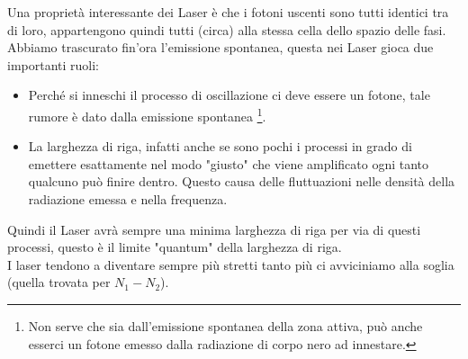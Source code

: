 Una proprietà interessante dei Laser è che i fotoni uscenti sono tutti identici tra di loro, appartengono quindi tutti (circa) alla stessa cella dello spazio delle fasi. \\
Abbiamo trascurato fin'ora l'emissione spontanea, questa nei Laser gioca due importanti ruoli:
\begin{itemize}
    \item Perché si inneschi il processo di oscillazione ci deve essere un fotone, tale rumore è dato dalla emissione spontanea 
    \footnote{Non serve che sia dall'emissione spontanea della zona attiva, può anche esserci un fotone emesso dalla radiazione di corpo nero ad innestare.}.
\item La larghezza di riga, infatti anche se sono pochi i processi in grado di emettere esattamente nel modo "giusto" che viene amplificato ogni tanto qualcuno può finire dentro. Questo causa delle fluttuazioni nelle densità della radiazione emessa e nella frequenza.
\end{itemize}
Quindi il Laser avrà sempre una minima larghezza di riga per via di questi processi, questo è il limite "quantum" della larghezza di riga.\\
I laser tendono a diventare sempre più stretti tanto più ci avviciniamo alla soglia (quella trovata per $N_1-N_2$).\\
